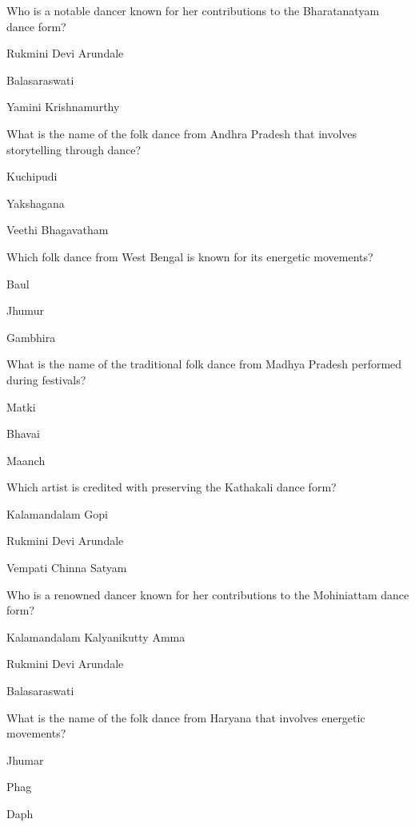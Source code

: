 \begin{enhancedmcq}{Who is a notable dancer known for her contributions to the Bharatanatyam dance form?}
\item Rukmini Devi Arundale
\item Balasaraswati
\item Yamini Krishnamurthy

\end{enhancedmcq}
\begin{enhancedmcq}{What is the name of the folk dance from Andhra Pradesh that involves storytelling through dance?}
\item Kuchipudi
\item Yakshagana
\item Veethi Bhagavatham

\end{enhancedmcq}
\begin{enhancedmcq}{Which folk dance from West Bengal is known for its energetic movements?}
\item Baul
\item Jhumur
\item Gambhira

\end{enhancedmcq}
\begin{enhancedmcq}{What is the name of the traditional folk dance from Madhya Pradesh performed during festivals?}
\item Matki
\item Bhavai
\item Maanch

\end{enhancedmcq}
\begin{enhancedmcq}{Which artist is credited with preserving the Kathakali dance form?}
\item Kalamandalam Gopi
\item Rukmini Devi Arundale
\item Vempati Chinna Satyam

\end{enhancedmcq}
\begin{enhancedmcq}{Who is a renowned dancer known for her contributions to the Mohiniattam dance form?}
\item Kalamandalam Kalyanikutty Amma
\item Rukmini Devi Arundale
\item Balasaraswati

\end{enhancedmcq}
\begin{enhancedmcq}{What is the name of the folk dance from Haryana that involves energetic movements?}
\item Jhumar
\item Phag
\item Daph

\end{enhancedmcq}
